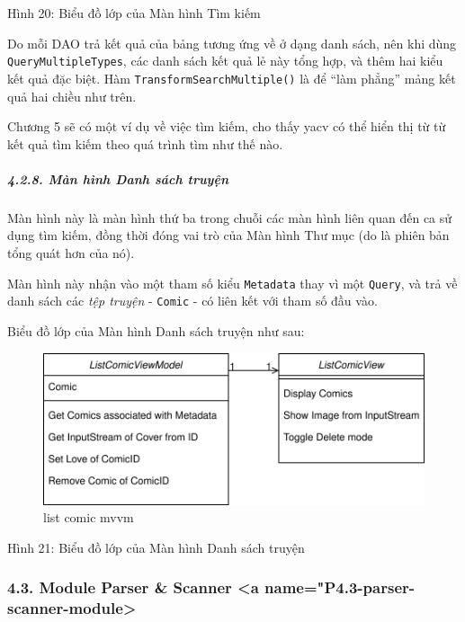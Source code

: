 \documentclass[
]{article}
\begin{document}
Hình 20: Biểu đồ lớp của Màn hình Tìm kiếm

Do mỗi DAO trả kết quả của bảng tương ứng về ở dạng danh sách, nên khi
dùng \texttt{QueryMultipleTypes}, các danh sách kết quả lẻ này tổng hợp,
và thêm hai kiểu kết quả đặc biệt. Hàm
\texttt{TransformSearchMultiple()} là để ``làm phẳng'' mảng kết quả hai
chiều như trên.

Chương 5 sẽ có một ví dụ về việc tìm kiếm, cho thấy yacv có thể hiển thị
từ từ kết quả tìm kiếm theo quá trình tìm như thế nào.

\hypertarget{muxe0n-huxecnh-danh-suxe1ch-truyux1ec7n}{%
\subparagraph{\texorpdfstring{4.2.8. Màn hình Danh sách truyện
}{4.2.8. Màn hình Danh sách truyện }}\label{muxe0n-huxecnh-danh-suxe1ch-truyux1ec7n}}

Màn hình này là màn hình thứ ba trong chuỗi các màn hình liên quan đến
ca sử dụng tìm kiếm, đồng thời đóng vai trò của Màn hình Thư mục (do là
phiên bản tổng quát hơn của nó).

Màn hình này nhận vào một tham số kiểu \texttt{Metadata} thay vì một
\texttt{Query}, và trả về danh sách các \emph{tệp truyện} -
\texttt{Comic} - có liên kết với tham số đầu vào.

Biểu đồ lớp của Màn hình Danh sách truyện như sau:

\begin{figure}
\centering
\includegraphics{../images/list_comics_mvvm_class.svg}
\caption{list comic mvvm}
\end{figure}

Hình 21: Biểu đồ lớp của Màn hình Danh sách truyện

\hypertarget{module-parser-scanner-a-namep4.3-parser-scanner-module}{%
\subsubsection{4.3. Module Parser \& Scanner \textless a
name="P4.3-parser-scanner-module>}\label{module-parser-scanner-a-namep4.3-parser-scanner-module}}
\end{document}
